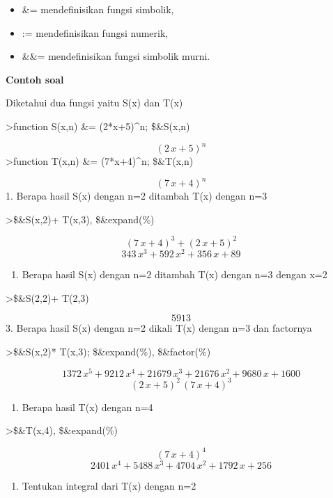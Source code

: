 \documentclass[
]{book}
\providecommand{\tightlist}{%
  \setlength{\itemsep}{0pt}\setlength{\parskip}{0pt}}
\begin{document}
\begin{itemize}
\tightlist
\item
  \&= mendefinisikan fungsi simbolik,
\item
  := mendefinisikan fungsi numerik,
\item
  \&\&= mendefinisikan fungsi simbolik murni.
\end{itemize}

\textbf{Contoh soal }

Diketahui dua fungsi yaitu S(x) dan T(x)

\textgreater function S(x,n) \&= (2*x+5)\^{}n; \$\&S(x,n)

\[\left(2\,x+5\right)^{n}\]\textgreater function T(x,n) \&= (7*x+4)\^{}n; \$\&T(x,n)

\[\left(7\,x+4\right)^{n}\] 1. Berapa hasil S(x) dengan n=2 ditambah T(x) dengan n=3

\textgreater\$\&S(x,2)+ T(x,3), \$\&expand(\%)

\[\left(7\,x+4\right)^3+\left(2\,x+5\right)^2\] \[343\,x^3+592\,x^2+356\,x+89\]

\begin{enumerate}
\def\labelenumi{\arabic{enumi}.}
\setcounter{enumi}{1}
\tightlist
\item
  Berapa hasil S(x) dengan n=2 ditambah T(x) dengan n=3 dengan x=2
\end{enumerate}

\textgreater\$\&S(2,2)+ T(2,3)

\[5913\] 3. Berapa hasil S(x) dengan n=2 dikali T(x) dengan n=3 dan factornya

\textgreater\$\&S(x,2)* T(x,3); \$\&expand(\%), \$\&factor(\%)

\[1372\,x^5+9212\,x^4+21679\,x^3+21676\,x^2+9680\,x+1600\] \[\left(2\,x+5\right)^2\,\left(7\,x+4\right)^3\]

\begin{enumerate}
\def\labelenumi{\arabic{enumi}.}
\setcounter{enumi}{3}
\tightlist
\item
  Berapa hasil T(x) dengan n=4
\end{enumerate}

\textgreater\$\&T(x,4), \$\&expand(\%)

\[\left(7\,x+4\right)^4\] \[2401\,x^4+5488\,x^3+4704\,x^2+1792\,x+256\]

\begin{enumerate}
\def\labelenumi{\arabic{enumi}.}
\setcounter{enumi}{4}
\tightlist
\item
  Tentukan integral dari T(x) dengan n=2
\end{enumerate}
\end{document}
